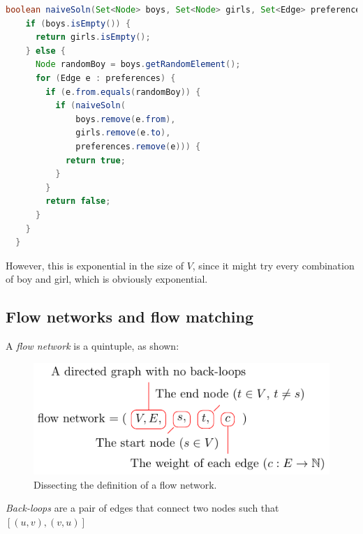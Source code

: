 \begin{lstlisting}[language=Java]
  boolean naiveSoln(Set<Node> boys, Set<Node> girls, Set<Edge> preferences) {
    if (boys.isEmpty()) {
      return girls.isEmpty();
    } else {
      Node randomBoy = boys.getRandomElement();
      for (Edge e : preferences) {
        if (e.from.equals(randomBoy)) {
          if (naiveSoln(
              boys.remove(e.from),
              girls.remove(e.to),
              preferences.remove(e))) {
            return true;
          }
        }
        return false;
      }
    }
  }
\end{lstlisting}

However, this is exponential in the size of $V$, since it might try every
combination of boy and girl, which is obviously exponential.

\subsection{Flow networks and flow matching}

A \textit{flow network} is a quintuple, as shown:

\begin{figure}[H]
  \centering
  \includegraphics{equations/flow-network}
  \caption{Dissecting the definition of a flow network.}
  \label{fig:flow-network-definition}
\end{figure}

\textit{Back-loops} are a pair of edges that connect two nodes such that
$[(u,v),(v,u)]$

